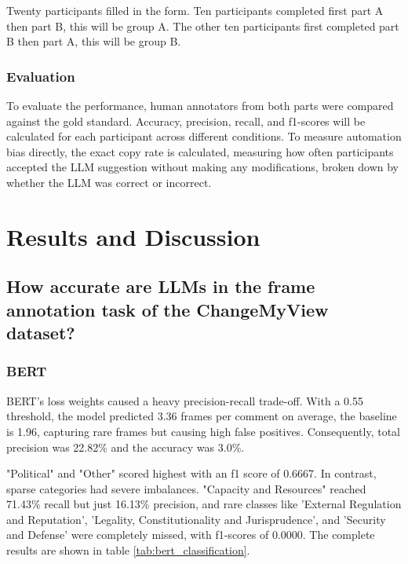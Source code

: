 \documentclass[
10pt, %
a4paper, %
oneside, %
headinclude,footinclude, %
] {book}%
\begin{document}
Twenty participants filled in the form. Ten participants completed first part A then part B, this will be group A. The other ten participants first completed part B then part A, this will be group B. 


\subsection{Evaluation}
To evaluate the performance, human annotators from both parts were compared against the gold standard. Accuracy, precision, recall, and f1-scores will be calculated for each participant across different conditions. To measure automation bias directly, the exact copy rate is calculated, measuring how often participants accepted the LLM suggestion without making any modifications, broken down by whether the LLM was correct or incorrect.



\chapter{Results and Discussion}
\section{How accurate are LLMs in the frame annotation task of the ChangeMyView dataset?}
\subsection{BERT} 
BERT's loss weights caused a heavy precision-recall trade-off. With a 0.55 threshold, the model predicted 3.36 frames per comment on average, the baseline is 1.96, capturing rare frames but causing high false positives. Consequently, total precision was 22.82\% and the accuracy was 3.0\%.

"Political" and "Other" scored highest with an f1 score of 0.6667. In contrast, sparse categories had severe imbalances. "Capacity and Resources" reached 71.43\% recall but just 16.13\% precision, and rare classes like 'External Regulation and Reputation', 'Legality, Constitutionality and Jurisprudence', and 'Security and Defense' were completely missed, with f1-scores of 0.0000. The complete results are shown in table \ref{tab:bert_classification}.
\end{document}
